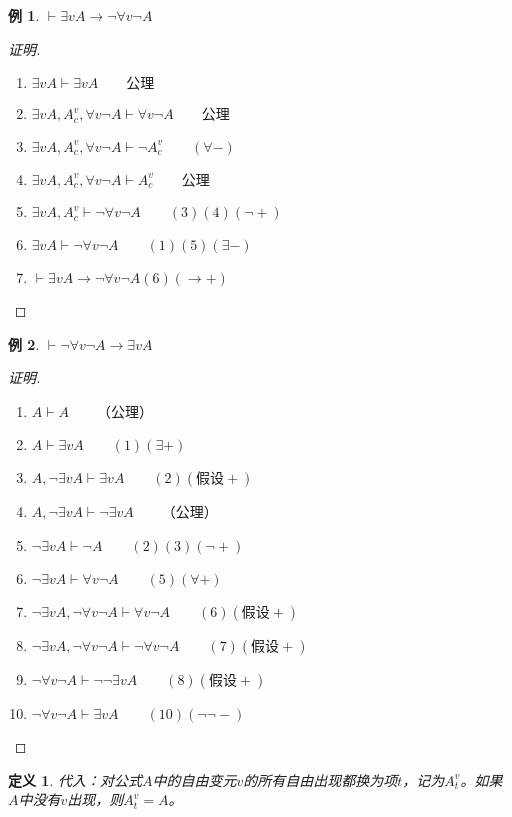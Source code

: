\documentclass{article}
\newtheorem{Def}{定义}
\newtheorem*{Example}{例}
\begin{document}
\begin{CJK*}{UTF8}{gbsn}
  \begin{Example}
    $\vdash \exists vA\to \lnot \forall v\lnot A$
  \end{Example}
  \begin{proof}[证明]

    $\qquad$

    \begin{enumerate}
      \item $\exists vA \vdash \exists v A\qquad \text{公理}$
      \item $\exists v A, A_c^v, \forall v \lnot A \vdash \forall v \lnot A\qquad \text{公理}$
      \item $\exists v A, A_c^v, \forall v \lnot A \vdash \lnot A_c^v\qquad (\forall -)$
      \item $\exists v A, A_c^v, \forall v \lnot A \vdash A_c^v\qquad \text{公理}$
      \item $\exists v A, A_c^v\vdash \lnot \forall v \lnot A\qquad (3)(4)(\lnot +)$
      \item $\exists v A\vdash \lnot \forall v \lnot A\qquad (1)(5)(\exists -)$
      \item $\vdash \exists vA\to \lnot \forall v\lnot A (6)(\to +)$
    \end{enumerate}
  \end{proof}
  \begin{Example}
    $\vdash \lnot \forall v\lnot A\to \exists vA$
  \end{Example}
  \begin{proof}[证明]

    $\qquad$

    \begin{enumerate}
      \item $A\vdash A\qquad$（公理）
      \item $A\vdash \exists v A\qquad(1)(\exists +)$
      \item $A, \lnot \exists v A\vdash \exists v A\qquad(2)(\text{假设}+)$
      \item $A, \lnot \exists v A\vdash \lnot \exists v A\qquad$（公理）
      \item $\lnot \exists v A\vdash \lnot A\qquad(2)(3)(\lnot +)$
      \item $\lnot \exists v A\vdash \forall v\lnot A\qquad(5)(\forall +)$
      \item $\lnot \exists v A, \lnot \forall v\lnot A\vdash \forall v\lnot A\qquad(6)(\text{假设} +)$
      \item $\lnot \exists v A, \lnot \forall v\lnot A\vdash \lnot \forall v\lnot A\qquad(7)(\text{假设} +)$
      \item $ \lnot \forall v\lnot A\vdash \lnot \lnot \exists v A\qquad(8)(\text{假设} +)$
      \item $ \lnot \forall v\lnot A\vdash \exists v A\qquad(10)(\lnot\lnot -)$
    \end{enumerate}
  \end{proof}
  \begin{Def}
    代入：对公式$A$中的自由变元$v$的所有自由出现都换为项$t$，记为$A_t^v$。如果$A$中没有$v$出现，则$A_t^v=A$。
  \end{Def}


\end{CJK*}
\end{document}
